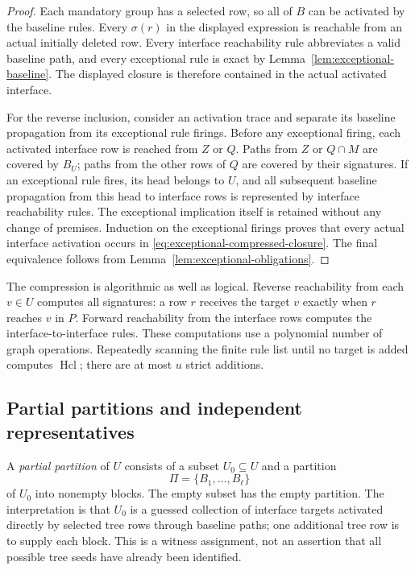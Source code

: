 \begin{proof}
Each mandatory group has a selected row, so all of $B$ can be activated
by the baseline rules.  Every $\sigma(r)$ in the displayed expression
is reachable from an actual initially deleted row.  Every interface
reachability rule abbreviates a valid baseline path, and every exceptional
rule is exact by Lemma~\ref{lem:exceptional-baseline}.  The displayed
closure is therefore contained in the actual activated interface.

For the reverse inclusion, consider an activation trace and separate its
baseline propagation from its exceptional rule firings.  Before any
exceptional firing, each activated interface row is reached from $Z$ or
$Q$.  Paths from $Z$ or $Q\cap M$ are covered by $B_U$; paths from the
other rows of $Q$ are covered by their signatures.  If an exceptional rule
fires, its head belongs to $U$, and all subsequent baseline propagation
from this head to interface rows is represented by interface reachability
rules.  The exceptional implication itself is retained without any
change of premises.  Induction on the exceptional firings proves that
every actual interface activation occurs in
\eqref{eq:exceptional-compressed-closure}.  The final equivalence follows
from Lemma~\ref{lem:exceptional-obligations}.
\end{proof}

The compression is algorithmic as well as logical.  Reverse reachability
from each $v\in U$ computes all signatures: a row $r$ receives the target
$v$ exactly when $r$ reaches $v$ in $P$.  Forward reachability from the
interface rows computes the interface-to-interface rules.  These
computations use a polynomial number of graph operations.  Repeatedly
scanning the finite rule list until no target is added computes
$\operatorname{Hcl}$; there are at most $u$ strict additions.

\subsection{Partial partitions and independent representatives}
\label{subsec:exceptional-partitions}

A \emph{partial partition} of $U$ consists of a subset $U_0\subseteq U$
and a partition
\[
                   \Pi=\{B_1,\ldots,B_\ell\}
\]
of $U_0$ into nonempty blocks.  The empty subset has the empty partition.
The interpretation is that $U_0$ is a guessed collection of interface
targets activated directly by selected tree rows through baseline paths;
one additional tree row is to supply each block.  This is a witness
assignment, not an assertion that all possible tree seeds have already
been identified.

